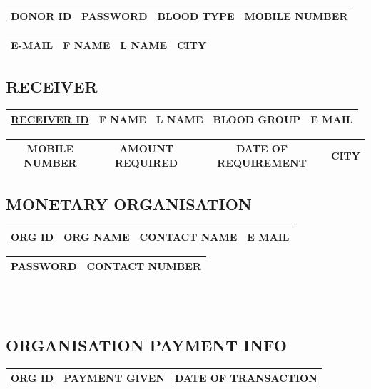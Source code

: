 \begin{sloppypar}
\begin{tabular}{ | c | c | c | c | }
 \hline
 \underline{DONOR ID} & PASSWORD & BLOOD TYPE & MOBILE NUMBER \\
 \hline
\end{tabular}
\begin{tabular}{ | c | c | c | c | }
 \hline
 E-MAIL & F NAME & L NAME & CITY \\
 \hline
\end{tabular}

\subsection{RECEIVER}

\begin{tabular}{ | c | c | c | c | c | }
 \hline
 \underline{RECEIVER ID} & F NAME & L NAME & BLOOD GROUP & E MAIL \\
 \hline
\end{tabular}
\begin{tabular}{ | c | c | c | c | }
 \hline
 MOBILE NUMBER & AMOUNT REQUIRED & DATE OF REQUIREMENT & CITY \\
 \hline
\end{tabular}

\subsection{MONETARY ORGANISATION}

\begin{tabular}{ | c | c | c | c | }
 \hline
 \underline{ORG ID} & ORG NAME & CONTACT NAME & E MAIL \\
 \hline
\end{tabular}
\begin{tabular}{ | c | c | }
 \hline
 PASSWORD & CONTACT NUMBER \\
 \hline
\end{tabular} \\ \\

\subsection{ORGANISATION PAYMENT INFO}

\begin{tabular}{ | c | c | c | }
 \hline
 \underline{ORG ID} & PAYMENT GIVEN & \underline{DATE OF TRANSACTION} \\
 \hline
\end{tabular}


\end{sloppypar}

